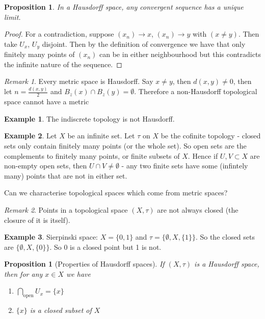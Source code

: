\documentclass{article}
\theoremstyle{definition}
\newtheorem{exmp}{Example}[section]
\theoremstyle{plain}%
\newtheorem{prop}[thm]{Proposition}
\theoremstyle{remark}
\newtheorem*{rem}{Remark}
\newcommand{\Intersection}{\bigcap}
\begin{document}
\begin{prop}
    In a Hausdorff space, any convergent sequence has a unique limit.
\end{prop}

\begin{proof}
    For a contradiction, suppose $(x_n) \to x$, $(x_n) \to y$ with $(x \ne y)$. Then take $U_x$, $U_y$ disjoint. Then by the definition of convergence we have that only finitely many points of $(x_n)$ can be in either neighbourhood but this contradicts the infinite nature of the sequence.
\end{proof}

\begin{rem}
    Every metric space is Hausdorff. Say $x \ne y$, then $d(x,y) \ne 0$, then let $n = \frac{d(x,y)}{2}$ and $B_z(x) \cap B_z(y) = \emptyset$. Therefore a non-Hausdorff topological space cannot have a metric
\end{rem}

\begin{exmp}
    The indiscrete topology is not Hausdorff.
\end{exmp}

\begin{exmp}
    Let $X$ be an infinite set. Let $\tau$ on $X$ be the cofinite topology - closed sets only contain finitely many points (or the whole set). So open sets are the complements to finitely many points, or finite subsets of $X$. Hence if $U,V \subset X$ are non-empty open sets, then $U \cap V \ne \emptyset$ - any two finite sets have some (infintely many) points that are not in either set.
\end{exmp}

Can we characterise topological spaces which come from metric spaces?

\begin{rem}
    Points in a topological space $(X, \tau)$ are not always closed (the closure of it is itself).
\end{rem}

\begin{exmp}
    Sierpinski space: $X = \{0,1\}$ and $\tau = \{\emptyset, X, \{1\}\}$. So the closed sets are $\{\emptyset, X, \{0\}\}$. So 0 is a closed point but 1 is not.
\end{exmp}

\begin{prop}[Properties of Hausdorff spaces]
    If $(X, \tau)$ is a Hausdorff space, then for any $x \in X$ we have
    \begin{enumerate}
        \item $\Intersection_{\text{open}} U_x = \{x\}$
        \item $\{x\}$ is a closed subset of $X$
    \end{enumerate}
\end{prop}
\end{document}

